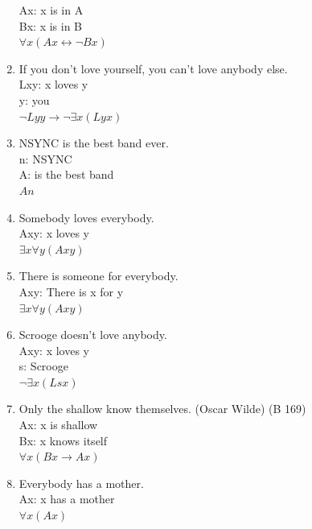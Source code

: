 \documentclass{article}
\begin{document}
\begin{enumerate}
          Ax: x is in A\\
          Bx: x is in B\\
          $\forall x(Ax \leftrightarrow \neg Bx)$
    \item If you don't love yourself, you can't love anybody else.\\
          Lxy: x loves y\\
          y: you\\
          $\neg Lyy \to \neg \exists x(Lyx)$
    \item NSYNC is the best band ever.\\
          n: NSYNC\\
          A: is the best band\\
          $An$
    \item Somebody loves everybody.\\
          Axy: x loves y\\
          $\exists x \forall y (Axy)$
    \item There is someone for everybody.\\
          Axy: There is x for y\\
          $\exists x \forall y(Axy)$
    \item Scrooge doesn't love anybody.\\
          Axy: x loves y\\
          s: Scrooge\\
          $\neg \exists x (Lsx)$
    \item Only the shallow know themselves. (Oscar Wilde) (B 169)\\
          Ax: x is shallow\\
          Bx: x knows itself\\
          $\forall x(Bx \to Ax)$
    \item Everybody has a mother.\\
          Ax: x has a mother\\
          $\forall x(Ax)$
\end{enumerate}
\end{document}
